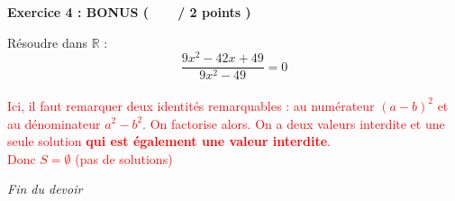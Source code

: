\documentclass[12pt,a4paper]{exam}
\begin{document}
\noindent
\textbf{Exercice 4 : BONUS (\ \ \ \  / 2 points )}
\vspace{5pt}

\begin{questions}

\question Résoudre dans $\mathbb{R}$ :
\[
\dfrac{9x^2-42x+49}{9x^2-49} = 0
\]
\textcolor{red}{
\\
\vspace{5pt}Ici, il faut remarquer deux identités remarquables : au numérateur $(a-b)^2$ et au 
dénominateur $a^2 - b^2$. On factorise alors. On a deux valeurs interdite et une seule solution 
\textbf{qui est également une valeur interdite}.
\\Donc $S = \emptyset$ (pas de solutions)}

\end{questions}

\vspace{10pt}

\begin{center}
    \textit{Fin du devoir}
\end{center}
\end{document}
